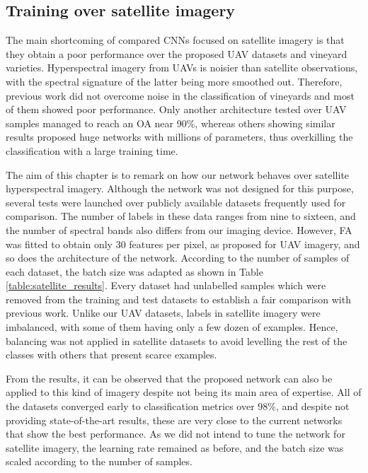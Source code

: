\subsection{Training over satellite imagery}

The main shortcoming of compared CNNs focused on satellite imagery is that they obtain a poor performance over the proposed UAV datasets and vineyard varieties. Hyperspectral imagery from UAVs is noisier than satellite observations, with the spectral signature of the latter being more smoothed out. Therefore, previous work did not overcome noise in the classification of vineyards and most of them showed poor performance. Only another architecture tested over UAV samples managed to reach an OA near 90\%, whereas others showing similar results proposed huge networks with millions of parameters, thus overkilling the classification with a large training time. 

The aim of this chapter is to remark on how our network behaves over satellite hyperspectral imagery. Although the network was not designed for this purpose, several tests were launched over publicly available datasets frequently used for comparison. The number of labels in these data ranges from nine to sixteen, and the number of spectral bands also differs from our imaging device. However, FA was fitted to obtain only 30 features per pixel, as proposed for UAV imagery, and so does the architecture of the network. According to the number of samples of each dataset, the batch size was adapted as shown in Table \ref{table:satellite_results}. Every dataset had unlabelled samples which were removed from the training and test datasets to establish a fair comparison with previous work. Unlike our UAV datasets, labels in satellite imagery were imbalanced, with some of them having only a few dozen of examples. Hence, balancing was not applied in satellite datasets to avoid levelling the rest of the classes with others that present scarce examples. 

From the results, it can be observed that the proposed network can also be applied to this kind of imagery despite not being its main area of expertise. All of the datasets converged early to classification metrics over 98\%, and despite not providing state-of-the-art results, these are very close to the current networks that show the best performance. As we did not intend to tune the network for satellite imagery, the learning rate remained as before, and the batch size was scaled according to the number of samples.

